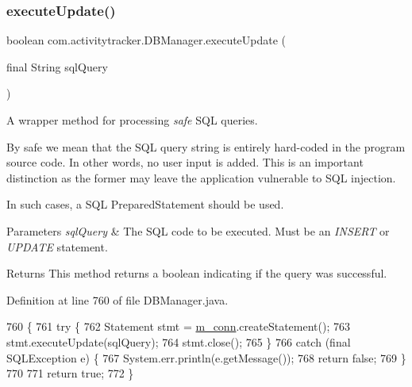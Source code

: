 \subsubsection{\texorpdfstring{execute\+Update()}{executeUpdate()}}
{\footnotesize\ttfamily boolean com.\+activitytracker.\+D\+B\+Manager.\+execute\+Update (\begin{DoxyParamCaption}\item[{final String}]{sql\+Query }\end{DoxyParamCaption})\hspace{0.3cm}{\ttfamily [private]}}

A wrapper method for processing {\itshape safe} S\+QL queries.

By safe we mean that the S\+QL query string is entirely hard-\/coded in the program source code. In other words, no user input is added. This is an important distinction as the former may leave the application vulnerable to S\+QL injection.

In such cases, a S\+QL Prepared\+Statement should be used.


\begin{DoxyParams}{Parameters}
{\em sql\+Query} & The S\+QL code to be executed. Must be an {\itshape I\+N\+S\+E\+RT} or {\itshape U\+P\+D\+A\+TE} statement.\\
\hline
\end{DoxyParams}
\begin{DoxyReturn}{Returns}
This method returns a boolean indicating if the query was successful. 
\end{DoxyReturn}


Definition at line 760 of file D\+B\+Manager.\+java.


\begin{DoxyCode}
760                                                          \{
761         \textcolor{keywordflow}{try} \{
762             Statement stmt = \mbox{\hyperlink{classcom_1_1activitytracker_1_1_d_b_manager_a064088d13ac09eb147fdc19268771521}{m\_conn}}.createStatement();
763             stmt.executeUpdate(sqlQuery);
764             stmt.close();
765         \}
766         \textcolor{keywordflow}{catch} (\textcolor{keyword}{final} SQLException e) \{
767             System.err.println(e.getMessage());
768             \textcolor{keywordflow}{return} \textcolor{keyword}{false};
769         \}
770 
771         \textcolor{keywordflow}{return} \textcolor{keyword}{true};
772     \}
\end{DoxyCode}
\mbox{\label{classcom_1_1activitytracker_1_1_d_b_manager_a0576baf67b45c7d2d0ba369052e4404e}} 
